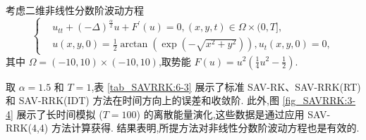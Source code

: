 	\begin{example}\label{exp_SAVRRK:3}
		考虑二维非线性分数阶波动方程\cite{wangUnconditionalEnergyDissipation2021} 
		\begin{equation}
		\begin{cases}
		& u_{t t}+(-\Delta)^{\frac{\alpha}{2}} u+F^{\prime}(u)=0,(x, y, t) \in \Omega \times(0, T],\\
		& u(x, y, 0)=\frac{1}{2} \arctan \left(\exp \left(-\sqrt{x^2+y^2}\right)\right), u_t(x, y, 0)=0,
		\end{cases}
		\end{equation}
		其中 $\Omega=(-10,10) \times(-10,10)$,取势能 $F(u)=u^2\left(\frac{1}{4} u^2-\frac{1}{2}\right)$.
		\end{example}
		
		取 $\alpha=1.5$ 和 $T=1$,表 \ref{tab_SAVRRK:6-3} 展示了标准 SAV-RK、SAV-RRK(RT) 和 SAV-RRK(IDT) 方法在时间方向上的误差和收敛阶.
		此外,图 \ref{fig_SAVRRK:3-4} 展示了长时间模拟 ($T=100$) 的离散能量演化,这些数据是通过应用 SAV-RRK(4,4) 方法计算获得.
		结果表明,所提方法对非线性分数阶波动方程也是有效的.
		
